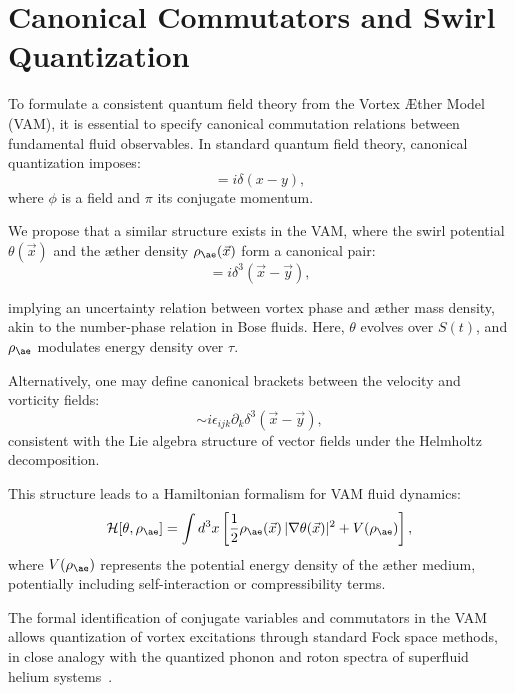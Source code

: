 
\section{Canonical Commutators and Swirl Quantization}

To formulate a consistent quantum field theory from the Vortex \AE{}ther Model (VAM), it is essential to specify canonical commutation relations between fundamental fluid observables. In standard quantum field theory, canonical quantization imposes:
\begin{equation}
[\phi(x), \pi(y)] = i \delta(x - y),
\end{equation}
where $\phi$ is a field and $\pi$ its conjugate momentum.

We propose that a similar structure exists in the VAM, where the swirl potential $\theta(\vec{x})$ and the \ae{}ther density $\rho_{\ae}(\vec{x})$ form a canonical pair:
\begin{equation}
[\theta(\vec{x}), \rho_{\ae}(\vec{y})] = i \delta^3(\vec{x} - \vec{y}),
\end{equation}

implying an uncertainty relation between vortex phase and \ae{}ther mass density, akin to the number-phase relation in Bose fluids. Here, $\theta$ evolves over $S(t)$, and $\rho_{\ae}$ modulates energy density over $\tau$.

Alternatively, one may define canonical brackets between the velocity and vorticity fields:
\begin{equation}
[v_i(\vec{x}), \omega_j(\vec{y})] \sim i \epsilon_{ijk} \partial_k \delta^3(\vec{x} - \vec{y}),
\end{equation}
consistent with the Lie algebra structure of vector fields under the Helmholtz decomposition.

This structure leads to a Hamiltonian formalism for VAM fluid dynamics:
\begin{equation}
\mathcal{H}[\theta, \rho_{\ae}] = \int d^3x \left[ \frac{1}{2} \rho_{\ae}(\vec{x})\, |\nabla \theta(\vec{x})|^2 + V(\rho_{\ae}) \right],
\end{equation}
where $V(\rho_{\ae})$ represents the potential energy density of the \ae{}ther medium, potentially including self-interaction or compressibility terms.

The formal identification of conjugate variables and commutators in the VAM allows quantization of vortex excitations through standard Fock space methods, in close analogy with the quantized phonon and roton spectra of superfluid helium systems~\cite{fetter1971nonuniform, stone2000superfluidity, verlinde2021qft}.
